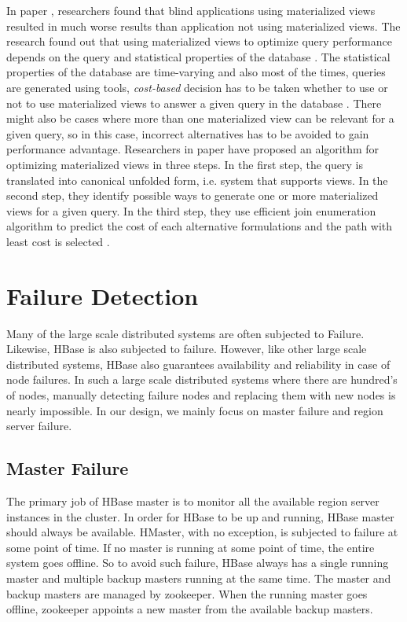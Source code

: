 \documentclass[11pt,a4paper,bibtotoc,idxtotoc,headsepline,footsepline,footexclude,BCOR12mm,DIV13]{scrbook}
\begin{document}
In paper \cite{maintenance:optimizingqueries}, researchers found that blind applications using materialized views resulted in much worse results than application not using materialized views. The research found out that using materialized views to optimize query performance depends on the query and statistical properties of the database \cite{maintenance:optimizingqueries}. The statistical properties of the database are time-varying and also most of the times, queries are generated using tools, \emph{cost-based} decision has to be taken whether to use or not to use materialized views to answer a given query in the database \cite{maintenance:optimizingqueries}. There might also be cases where more than one materialized view can be relevant for a given query, so in this case, incorrect alternatives has to be avoided to gain performance advantage. Researchers in paper  \cite{maintenance:optimizingqueries} have proposed an algorithm for optimizing materialized views in three steps. In the first step, the query is translated into canonical unfolded form, i.e. system that supports views. In the second step, they identify possible ways to generate one or more materialized views for a given query. In the third step, they use efficient join enumeration algorithm to predict the cost of each alternative formulations and the path with least cost is selected \cite{maintenance:optimizingqueries}.

\chapter{Failure Detection}
\label{Failure Detection}
Many of the large scale distributed systems are often subjected to Failure. Likewise, HBase is also subjected to failure. However, like other large scale distributed systems, HBase also guarantees availability and reliability in case of node failures. In such a large scale distributed systems where there are hundred's of nodes, manually detecting failure nodes and replacing them with new nodes is nearly impossible. In our design, we mainly focus on master failure and region server failure.

\section{Master Failure}
\label{Master Failure}
The primary job of HBase master is to monitor all the available region server instances in the cluster. In order for HBase to be up and running, HBase master should always be available. HMaster, with no exception, is subjected to failure at some point of time. If no master is running at some point of time, the entire system goes offline. So to avoid such failure, HBase always has a single running master and multiple backup masters running at the same time. The master and backup masters are managed by zookeeper. When the running master goes offline, zookeeper appoints a new master from the available backup masters.
\end{document}
